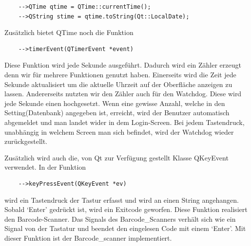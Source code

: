 \documentclass[11pt,a4paper]{article} %
\begin{document}
	\begin{frame}

\begin{lstlisting}
	-->QTime qtime = QTime::currentTime();
	-->QString stime = qtime.toString(Qt::LocalDate);
	\end{lstlisting}
\end{frame}
	Zusätzlich bietet QTime noch die Funktion 
	\begin{frame}

\begin{lstlisting}
	-->timerEvent(QTimerEvent *event)
	\end{lstlisting}
\end{frame}
	Diese Funktion wird jede Sekunde ausgeführt. Dadurch wird ein Zähler erzeugt denn wir für mehrere Funktionen genutzt haben.
	Einerseits wird die Zeit jede Sekunde aktualisiert um die aktuelle Uhrzeit auf der Oberfläche anzeigen zu lassen.
	Andererseits nutzten wir den Zähler auch für den Watchdog. Diese wird jede Sekunde einen hochgesetzt. Wenn eine gewisse Anzahl, welche in den Setting(Datenbank) angegeben ist, erreicht, 
	wird der Benutzer automatisch abgemeldet und man landet wider in dem Login-Screen. Bei jedem Tastendruck, unabhängig in welchem Screen man sich befindet, wird der Watchdog wieder zurückgestellt.
\par	
	Zusätzlich wird auch die, von Qt zur Verfügung gestellt Klasse QKeyEvent verwendet. In der Funktion 
	\begin{frame}

\begin{lstlisting}
	-->keyPressEvent(QKeyEvent *ev)
	\end{lstlisting}
\end{frame}
	  wird ein Tastendruck der Tastur erfasst und wird an einen String angehangen.
	Sobald `Enter' gedrückt ist, wird ein Exitcode geworfen. Diese Funktion realisiert den Barcode-Scanner. 
	Das Signals des Barcode\_Scanners verhält sich wie ein Signal von der Tastatur und beendet den eingelesen Code mit einem `Enter'. Mit dieser Funktion ist der Barcode\_scanner implementiert.
\par	
\end{document}
